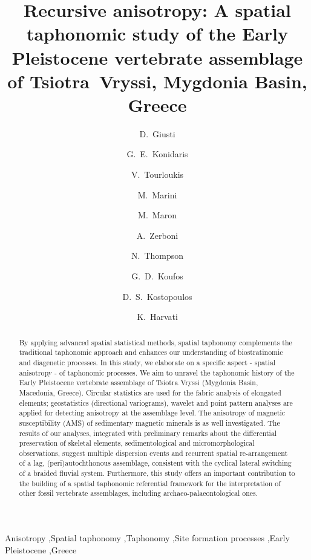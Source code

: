 \documentclass[review,times,authoryear]{elsarticle} %
\begin{document}
\begin{frontmatter}
  
  \title{Recursive anisotropy: A spatial taphonomic study of the Early Pleistocene vertebrate assemblage of Tsiotra~Vryssi, Mygdonia Basin, Greece}
  
  \author[tue]{D.~Giusti}
  
  \author[tue]{G.~E.~Konidaris}
  \author[tue]{V.~Tourloukis}
  \author[mi]{M.~Marini}
  \author[mi]{M.~Maron}
  \author[mi]{A.~Zerboni}
  \author[tue]{N.~Thompson}
  \author[thess]{G.~D.~Koufos}
  \author[thess]{D.~S.~Kostopoulos}
  \author[tue]{K.~Harvati}
  
  \address[tue]{Paläoanthropologie, Senckenberg Centre for Human Evolution and Palaeoenvironment, Eberhard Karls Universität Tübingen, Rümelinstr. 23, 72070 Tübingen, Germany}
  \address[mi]{Università degli Studi di Milano, via Mangiagalli 34, 20133 Milano, Italy}
  \address[thess]{Aristotle University of Thessaloniki, Department of Geology, Laboratory of Geology and Palaeontology, 54124 Thessaloniki, Greece}

  \begin{abstract} %
    By applying advanced spatial statistical methods, spatial taphonomy complements the traditional taphonomic approach and enhances our understanding of biostratinomic and diagenetic processes. In this study, we elaborate on a specific aspect - spatial anisotropy - of taphonomic processes. We aim to unravel the taphonomic history of the Early Pleistocene vertebrate assemblage of Tsiotra Vryssi (Mygdonia Basin, Macedonia, Greece). Circular statistics are used for the fabric analysis of elongated elements; geostatistics (directional variograms), wavelet and point pattern analyses are applied for detecting anisotropy at the assemblage level. The anisotropy of magnetic susceptibility (AMS) of sedimentary magnetic minerals is as well investigated. The results of our analyses, integrated with preliminary remarks about the differential preservation of skeletal elements, sedimentological and micromorphological observations, suggest multiple dispersion events and recurrent spatial re-arrangement of a lag, (peri)autochthonous assemblage, consistent with the cyclical lateral switching of a braided fluvial system. Furthermore, this study offers an important contribution to the building of a spatial taphonomic referential framework for the interpretation of other fossil vertebrate assemblages, including archaeo-palaeontological ones.
  \end{abstract}
  
  \begin{keyword} %
    Anisotropy \sep Spatial taphonomy \sep Taphonomy \sep Site formation processes \sep Early Pleistocene \sep Greece
  \end{keyword}
  
\end{frontmatter}
\end{document}
